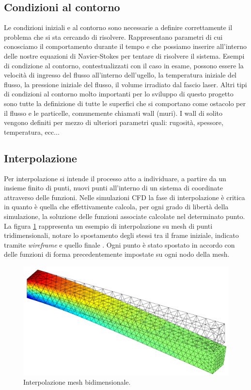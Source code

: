     \subsection{Condizioni al contorno}\label{boundary_conditions}
    Le condizioni iniziali e al contorno sono necessarie a definire correttamente il problema che si sta cercando di risolvere. Rappresentano parametri di cui conosciamo il comportamento durante il tempo
    e che possiamo inserire all'interno delle nostre equazioni di Navier-Stokes per tentare di risolvere il sistema.
    Esempi di condizione al contorno, contestualizzati con il caso in esame,  possono essere la velocità di ingresso del flusso all'interno dell'ugello, la temperatura iniziale del flusso,
    la pressione iniziale del flusso, il volume irradiato dal fascio laser. Altri tipi di condizioni al contorno molto importanti per lo sviluppo di questo progetto sono tutte la definizione
    di tutte le superfici che si comportano come ostacolo per il flusso e le particelle, comunemente chiamati wall (muri). I wall di solito vengono definiti per mezzo di ulteriori parametri quali:
    rugosità, spessore, temperatura, ecc...

    \subsection{Interpolazione}\label{interpolazione}
    Per interpolazione si intende il processo atto a individuare, a partire da un insieme finito di punti, nuovi punti all'interno di un sistema di coordinate attraverso delle funzioni.
    Nelle simulazioni CFD la fase di interpolazione è critica in quanto è quella che effettivamente calcola, per ogni grado di libertà della simulazione, la soluzione delle funzioni associate calcolate
    nel determinato punto.
    La figura \ref*{fig:interpolazione} rappresenta un esempio di interpolazione su mesh di punti tridimensionali, notare lo spostamento degli stessi tra il frame iniziale, indicato tramite \textit{wireframe} e quello finale
    . Ogni punto è stato spostato in accordo con delle funzioni di forma precedentemente impostate su ogni nodo della mesh. 
    \begin{figure}[H]\label{fig:interpolazione}
        \centering
        \includegraphics[width=\linewidth]{figure/interpolation.png}
        \caption{Interpolazione mesh bidimensionale.}
    \end{figure}

